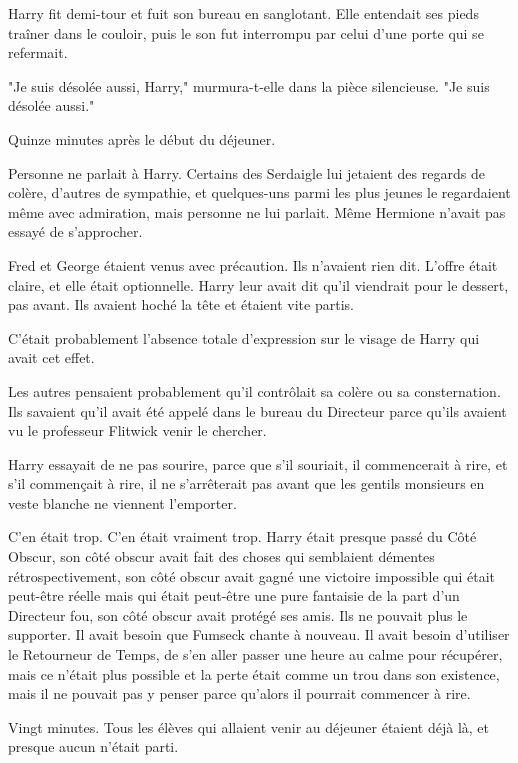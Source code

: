 Harry fit demi-tour et fuit son bureau en sanglotant. Elle entendait ses pieds traîner dans le couloir, puis le son fut interrompu par celui d'une porte qui se refermait.

"Je suis désolée aussi, Harry," murmura-t-elle dans la pièce silencieuse. "Je suis désolée aussi."

\later

Quinze minutes après le début du déjeuner.

Personne ne parlait à Harry. Certains des Serdaigle lui jetaient des regards de colère, d'autres de sympathie, et quelques-uns parmi les plus jeunes le regardaient même avec admiration, mais personne ne lui parlait. Même Hermione n'avait pas essayé de s'approcher.

Fred et George étaient venus avec précaution. Ils n'avaient rien dit. L'offre était claire, et elle était optionnelle. Harry leur avait dit qu'il viendrait pour le dessert, pas avant. Ils avaient hoché la tête et étaient vite partis.

C'était probablement l'absence totale d'expression sur le visage de Harry qui avait cet effet.

Les autres pensaient probablement qu'il contrôlait sa colère ou sa consternation. Ils savaient qu'il avait été appelé dans le bureau du Directeur parce qu'ils avaient vu le professeur Flitwick venir le chercher.

Harry essayait de ne pas sourire, parce que s'il souriait, il commencerait à rire, et s'il commençait à rire, il ne s'arrêterait pas avant que les gentils monsieurs en veste blanche ne viennent l'emporter.

C'en était trop. C'en était vraiment trop. Harry était presque passé du Côté Obscur, son côté obscur avait fait des choses qui semblaient démentes rétrospectivement, son côté obscur avait gagné une victoire impossible qui était peut-être réelle mais qui était peut-être une pure fantaisie de la part d'un Directeur fou, son côté obscur avait protégé ses amis. Ils ne pouvait plus le supporter. Il avait besoin que Fumseck chante à nouveau. Il avait besoin d'utiliser le Retourneur de Temps, de s'en aller passer une heure au calme pour récupérer, mais ce n'était plus possible et la perte était comme un trou dans son existence, mais il ne pouvait pas y penser parce qu'alors il pourrait commencer à rire.

Vingt minutes. Tous les élèves qui allaient venir au déjeuner étaient déjà là, et presque aucun n'était parti.

